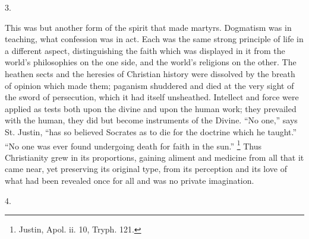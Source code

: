 3.

This was but another form of the spirit that made
martyrs. Dogmatism was in teaching, what confession was
in act. Each was the same strong principle of life in a
different aspect, distinguishing the faith which was
displayed in it from the world's philosophies on the one
side, and the world's religions on the other. The heathen
sects and the heresies of Christian history were
dissolved by the breath of opinion which made them;
paganism shuddered and died at the very sight of the
sword of persecution, which it had itself unsheathed.
Intellect and force were applied as tests both upon the
divine and upon the human work; they prevailed with the
human, they did but become instruments of the Divine.
``No one,'' says St. Justin, ``has so
believed Socrates as to die for the doctrine which he
taught.'' ``No one was ever found undergoing
death for faith in the sun.'' \footnote{Justin, Apol. ii. 10, Tryph. 121.} Thus Christianity grew in its
proportions, gaining aliment and medicine from all that
it came near, yet preserving its original type, from its
perception and its love of what had been revealed once
for all and was no private imagination.

4.

